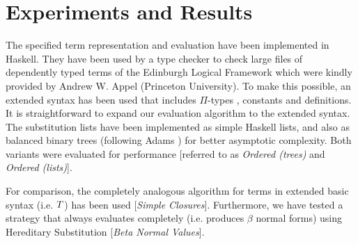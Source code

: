 \documentclass[submission,copyright,creativecommons]{eptcs}
\begin{document}
%
%











\section{Experiments and Results}
\label{sec:experiments}

The specified term representation and evaluation have been implemented
in Haskell. They have been used by a type checker to check large files
of dependently
typed terms of the Edinburgh Logical Framework which were kindly
provided by Andrew W. Appel (Princeton University). To make this
possible, an extended syntax has been used that includes $\Pi$-types%
, constants and definitions. It is straightforward to expand our
evaluation algorithm to the extended syntax. The substitution lists
have been implemented as simple Haskell lists, and also as balanced
binary trees (following Adams \cite{adams:jfp93})
for better asymptotic complexity.  Both variants were
evaluated for performance 
[referred to as \emph{Ordered (trees)} and \emph{Ordered (lists)}].

For comparison, the completely analogous algorithm for terms in
extended basic syntax (i.e. $T$) has been used [\emph{Simple
  Closures}]. Furthermore, we have tested a strategy that always
evaluates completely (i.e. produces $\beta$ normal forms) using
Hereditary Substitution [\emph{Beta Normal Values}].
\end{document}
